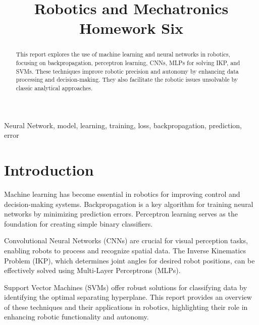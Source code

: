 \documentclass[conference]{IEEEtran}
\title{Robotics and Mechatronics\\
{\LARGE Homework Six}
}
\author{\IEEEauthorblockN{Mohammad Montazeri}
    \IEEEauthorblockA{\textit{School of Mechanical Engineering} \\
        \textit{College of Engineering, University of Tehran}\\
        Tehran, Iran; 810699269 \\
        mohammadmontazeri@ut.ac.ir}
}
\begin{document}
\maketitle

\begin{abstract}
    This report explores the use of machine learning  and neural networks in robotics, focusing on backpropagation, perceptron learning, CNNs, MLPs for solving IKP, and SVMs. These techniques improve robotic precision and autonomy by enhancing data processing and decision-making. They also facilitate the robotic issues unsolvable by classic analytical approaches.
\end{abstract}

\begin{IEEEkeywords}
    Neural Network, model, learning, training, loss, backpropagation, prediction, error
\end{IEEEkeywords}

\section{Introduction}
Machine learning has become essential in robotics for improving control and decision-making systems. Backpropagation is a key algorithm for training neural networks by minimizing prediction errors. Perceptron learning serves as the foundation for creating simple binary classifiers.

Convolutional Neural Networks (CNNs) are crucial for visual perception tasks, enabling robots to process and recognize spatial data. The Inverse Kinematics Problem (IKP), which determines joint angles for desired robot positions, can be effectively solved using Multi-Layer Perceptrons (MLPs).

Support Vector Machines (SVMs) offer robust solutions for classifying data by identifying the optimal separating hyperplane. This report provides an overview of these techniques and their applications in robotics, highlighting their role in enhancing robotic functionality and autonomy.
\vspace{8px}
\end{document}
